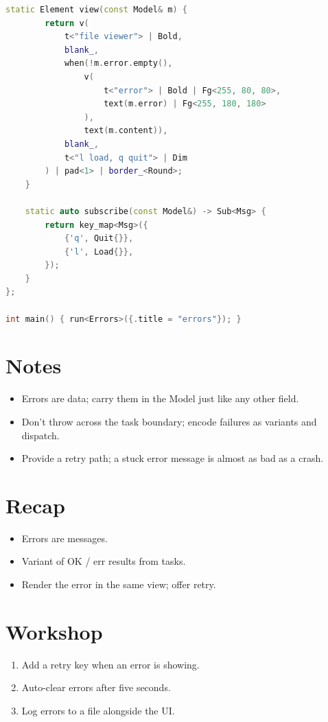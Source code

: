 \begin{lstlisting}[language=C++]
    static Element view(const Model& m) {
        return v(
            t<"file viewer"> | Bold,
            blank_,
            when(!m.error.empty(),
                v(
                    t<"error"> | Bold | Fg<255, 80, 80>,
                    text(m.error) | Fg<255, 180, 180>
                ),
                text(m.content)),
            blank_,
            t<"l load, q quit"> | Dim
        ) | pad<1> | border_<Round>;
    }

    static auto subscribe(const Model&) -> Sub<Msg> {
        return key_map<Msg>({
            {'q', Quit{}},
            {'l', Load{}},
        });
    }
};

int main() { run<Errors>({.title = "errors"}); }
\end{lstlisting}

\section{Notes}

\begin{itemize}[leftmargin=*]
  \item Errors are data; carry them in the Model just like
    any other field.
  \item Don't throw across the task boundary; encode failures
    as variants and dispatch.
  \item Provide a retry path; a stuck error message is
    almost as bad as a crash.
\end{itemize}

\section{Recap}

\begin{recap}
\begin{itemize}[leftmargin=*]
  \item Errors are messages.
  \item Variant of OK / err results from tasks.
  \item Render the error in the same view; offer retry.
\end{itemize}
\end{recap}

\section*{Workshop}

\begin{enumerate}[leftmargin=*]
  \item Add a retry key when an error is showing.
  \item Auto-clear errors after five seconds.
  \item Log errors to a file alongside the UI.
\end{enumerate}
